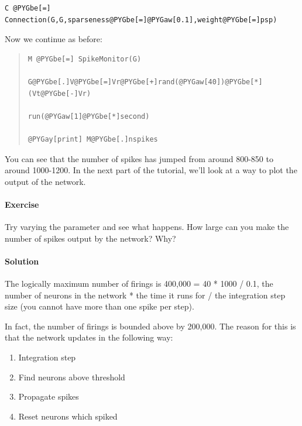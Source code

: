 \documentclass[letterpaper,10pt,english]{manual}
\begin{document}
\begin{Verbatim}[commandchars=@\[\]]
C @PYGbe[=] Connection(G,G,sparseness@PYGbe[=]@PYGaw[0.1],weight@PYGbe[=]psp)
\end{Verbatim}

Now we continue as before:
\begin{quote}

\begin{Verbatim}[commandchars=@\[\]]
M @PYGbe[=] SpikeMonitor(G)

G@PYGbe[.]V@PYGbe[=]Vr@PYGbe[+]rand(@PYGaw[40])@PYGbe[*](Vt@PYGbe[-]Vr)

run(@PYGaw[1]@PYGbe[*]second)

@PYGay[print] M@PYGbe[.]nspikes
\end{Verbatim}
\end{quote}

You can see that the number of spikes has jumped from around
800-850 to around 1000-1200. In the next part of the tutorial,
we'll look at a way to plot the output of the network.


\paragraph{Exercise}

Try varying the parameter  and see what happens. How large
can you make the number of spikes output by the network? Why?


\paragraph{Solution}

The logically maximum number of firings is
400,000 = 40 * 1000 / 0.1, the number of neurons in the
network * the time it runs for / the integration step size (you
cannot have more than one spike per step).

In fact, the number of firings is bounded above by 200,000. The
reason for this is that the network updates in the following way:
\begin{enumerate}
\item {} 
Integration step

\item {} 
Find neurons above threshold

\item {} 
Propagate spikes

\item {} 
Reset neurons which spiked

\end{enumerate}
\end{document}
